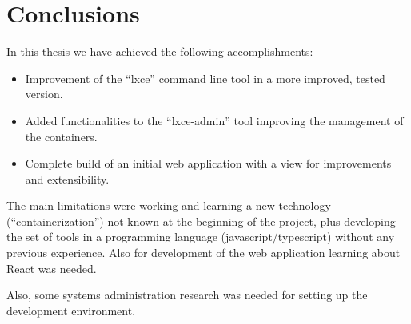 \section{Conclusions}
In this thesis we have achieved the following accomplishments:
\begin{itemize}
	\item{Improvement of the ``lxce'' command line tool in a more improved, tested version.}
	\item{Added functionalities to the ``lxce-admin'' tool improving the management of the containers.}
	\item{Complete build of an initial web application with a view for improvements and extensibility.}
\end{itemize}

The main limitations were working and learning a new technology (``containerization'') not known at the beginning of the project, plus developing the set of tools in a programming language (javascript/typescript) without any previous experience. Also for development of the web application learning about React was needed.

Also, some systems administration research was needed for setting up the development environment.
